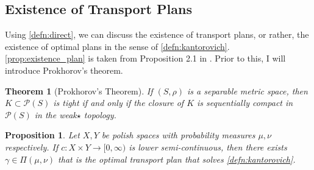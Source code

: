 \documentclass[12pt]{article}
\theoremstyle{plain}
\newtheorem{thm}{Theorem}[section]
\newtheorem{prop}{Proposition}[section]
\numberwithin{equation}{section}
\begin{document}
\subsection{Existence of Transport Plans}
Using \autoref{defn:direct}, we can discuss the existence of transport plans, or rather, the existence of optimal plans in the sense of \autoref{defn:kantorovich}. \autoref{prop:existence_plan} is taken from Proposition 2.1 in \cite{villani}. Prior to this, I will introduce Prokhorov's theorem.
\begin{thm}[Prokhorov's Theorem]
  If $(S,\rho)$ is a separable metric space, then $K\subset \mathcal{P}(S)$ is tight if and only if the closure of $K$ is sequentially compact in $\mathcal{P}(S)$ in the weak$\star$ topology.
\end{thm}
\begin{prop}\label{prop:existence_plan}
  Let $X,Y$ be polish spaces with probability measures $\mu,\nu$ respectively. If $c : X\times Y \to [0,\infty)$ is lower semi-continuous, then there exists $\gamma\in \Pi(\mu,\nu)$
  that is the optimal transport plan that solves \autoref{defn:kantorovich}. 
\end{prop}
\end{document}
